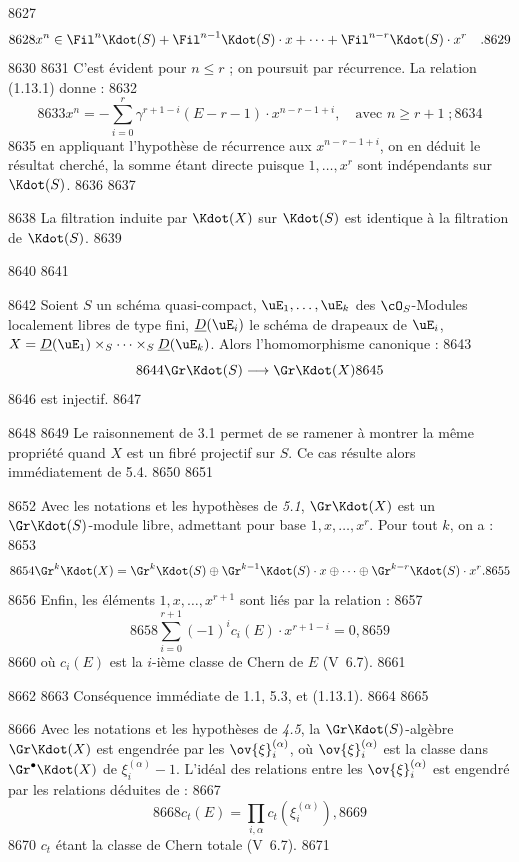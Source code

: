   8627	\[
  8628	x^n \in \Fil^n \Kdot(S) + \Fil^{n-1}\Kdot(S) \cdot x + \dots + \Fil^{n-r}\Kdot(S) \cdot x^r \quad .
  8629	\]
  8630	
  8631	C'est \'evident pour $n \leq r$ ; on poursuit par r\'ecurrence. La relation (1.13.1) donne :
  8632	\[
  8633	x^n = -\sum_{i=0}^{r} \gamma^{r+1-i}(E - r - 1) \cdot x^{n-r-1+i}, \quad \text{avec } n \geq r+1 \; ;
  8634	\]
  8635	en appliquant l'hypoth\`ese de r\'ecurrence aux $x^{n-r-1+i}$, on en d\'eduit le r\'esultat cherch\'e, la somme \'etant directe puisque $1,\dots,x^r$ sont ind\'ependants sur $\Kdot(S)$.
  8636	
  8637	\begin{corollaire}[5.4]
  8638	La filtration induite par $\Kdot(X)$ sur $\Kdot(S)$ est identique \`a la filtration de $\Kdot(S)$.
  8639	\end{corollaire}
  8640	
  8641	\begin{corollaire}[5.5]
  8642	Soient $S$ un sch\'ema quasi-compact, $\uE_1,\dots,\uE_k$ des $\cO_S$-Modules localement libres de type fini, $\underline{D}(\uE_i)$ le sch\'ema de drapeaux de $\uE_i$, $X = \underline{D}(\uE_1) \times_S \dots \times_S \underline{D}(\uE_k)$. Alors l'homomorphisme canonique :
  8643	\[
  8644	\Gr \Kdot(S) \longrightarrow \Gr \Kdot(X)
  8645	\]
  8646	est injectif.
  8647	\end{corollaire}
  8648	
  8649	Le raisonnement de 3.1 permet de se ramener \`a montrer la m\^eme propri\'et\'e quand $X$ est un fibr\'e projectif sur $S$. Ce cas r\'esulte alors imm\'ediatement de 5.4.
  8650	
  8651	\begin{corollaire}[5.6]
  8652	Avec les notations et les hypoth\`eses de \emph{5.1}, $\Gr \Kdot(X)$ est un $\Gr \Kdot(S)$-module libre, admettant pour base $1, x, \dots, x^r$. Pour tout $k$, on a :
  8653	\[
  8654	\Gr^k \Kdot(X) = \Gr^k \Kdot(S) \oplus \Gr^{k-1}\Kdot(S) \cdot x \oplus \dots \oplus \Gr^{k-r}\Kdot(S) \cdot x^r.
  8655	\]
  8656	Enfin, les \'el\'ements $1, x, \dots, x^{r+1}$ sont li\'es par la relation :
  8657	\[
  8658	\sum_{i=0}^{r+1} (-1)^i c_i(E) \cdot x^{r+1-i} = 0,
  8659	\]
  8660	o\`u $c_i(E)$ est la $i$-i\`eme classe de Chern de $E$ (V~6.7).
  8661	\end{corollaire}
  8662	
  8663	Cons\'equence imm\'ediate de 1.1, 5.3, et (1.13.1).
  8664	
  8665	\begin{corollaire}[5.7]
  8666	Avec les notations et les hypoth\`eses de \emph{4.5}, la $\Gr \Kdot(S)$-alg\`ebre $\Gr \Kdot(X)$ est engendr\'ee par les $\ov{\xi}_i^{(\alpha)}$, o\`u $\ov{\xi}_i^{(\alpha)}$ est la classe dans $\Gr^{\bullet} \Kdot(X)$ de $\xi_i^{(\alpha)} - 1$. L'id\'eal des relations entre les $\ov{\xi}_i^{(\alpha)}$ est engendr\'e par les relations d\'eduites de :
  8667	\[
  8668	c_t(E) = \prod_{i,\alpha} c_t(\xi_i^{(\alpha)}),
  8669	\]
  8670	$c_t$ \'etant la classe de Chern totale (V~6.7).
  8671	\end{corollaire}
